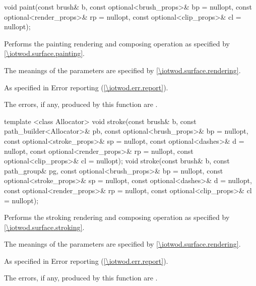 %
%
\begin{itemdecl}
void paint(const brush& b, const optional<brush_props>& bp = nullopt,
  const optional<render_props>& rp = nullopt,
  const optional<clip_props>& cl = nullopt);
\end{itemdecl}
\begin{itemdescr}
\pnum
\effects
Performs the painting rendering and composing operation as specified by \ref{\iotwod.surface.painting}.

\pnum
The meanings of the parameters are specified by \ref{\iotwod.surface.rendering}.

\pnum
\throws
As specified in Error reporting (\ref{\iotwod.err.report}).

\pnum
\errors
The errors, if any, produced by this function are .
\end{itemdescr}

%
%
\begin{itemdecl}
template <class Allocator>
void stroke(const brush& b, const path_builder<Allocator>& pb,
  const optional<brush_props>& bp = nullopt,
  const optional<stroke_props>& sp = nullopt,
  const optional<dashes>& d = nullopt,
  const optional<render_props>& rp = nullopt,
  const optional<clip_props>& cl = nullopt);
void stroke(const brush& b, const path_group& pg,
  const optional<brush_props>& bp = nullopt,
  const optional<stroke_props>& sp = nullopt,
  const optional<dashes>& d = nullopt,
  const optional<render_props>& rp = nullopt,
  const optional<clip_props>& cl = nullopt);
\end{itemdecl}
\begin{itemdescr}
\pnum
\effects
Performs the stroking rendering and composing operation as specified by \ref{\iotwod.surface.stroking}.

\pnum
The meanings of the parameters are specified by \ref{\iotwod.surface.rendering}.

\pnum
\throws
As specified in Error reporting (\ref{\iotwod.err.report}).

\pnum
\errors
The errors, if any, produced by this function are .
\end{itemdescr}


